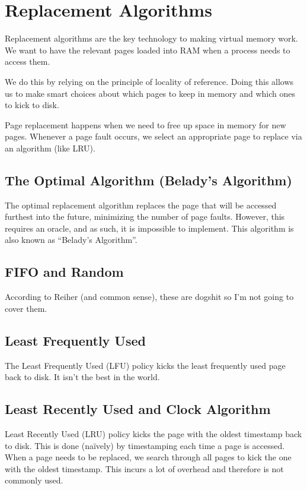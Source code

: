 \documentclass{report}
\begin{document}
\section{Replacement Algorithms}
Replacement algorithms are the key technology to making virtual memory work. We want to have the
relevant pages loaded into RAM when a process needs to access them.

We do this by relying on the principle of locality of reference. Doing this allows us to make smart
choices about which pages to keep in memory and which ones to kick to disk.

Page replacement happens when we need to free up space in memory for new pages. Whenever a page
fault occurs, we select an appropriate page to replace via an algorithm (like LRU).


\subsection{The Optimal Algorithm (Belady's Algorithm)}
The optimal replacement algorithm replaces the page that will be accessed furthest into the future,
minimizing the number of page faults. However, this requires an oracle, and as such, it is
impossible to implement. This algorithm is also known as ``Belady's Algorithm''.


\subsection{FIFO and Random}
According to Reiher (and common sense), these are dogshit so I'm not going to cover them.


\subsection{Least Frequently Used}
The Least Frequently Used (LFU) policy kicks the least frequently used page back to disk. It isn't
the best in the world.


\subsection{Least Recently Used and Clock Algorithm}
\label{subsec:LRU}
Least Recently Used (LRU) policy kicks the page with the oldest timestamp back to disk. This is done
(naïvely) by timestamping each time a page is accessed. When a page needs to be replaced, we search
through all pages to kick the one with the oldest timestamp. This incurs a lot of overhead and
therefore is not commonly used.
\end{document}
